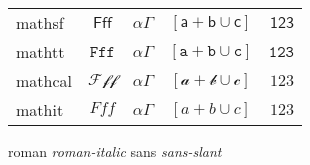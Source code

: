 \documentclass{article}
\def\ltrs{Fff}
\def\grk{\alpha \Gamma}
\def\sym{[a + b \cup c]}
\def\num{123}
\begin{document}
\begin{tabular}{lcccr}
mathsf  & {\boldmath   $\mathsf{\ltrs}$ } & {\boldmath  $\mathsf{\grk}$ } & {\boldmath  $\mathsf{\sym}$ } & {\boldmath  $\mathsf{\num}$ }\\
mathtt  & {\boldmath   $\mathtt{\ltrs}$ } & {\boldmath  $\mathtt{\grk}$ } & {\boldmath  $\mathtt{\sym}$ } & {\boldmath  $\mathtt{\num}$ }\\
mathcal  & {\boldmath   $\mathcal{\ltrs}$ } & {\boldmath  $\mathcal{\grk}$ } & {\boldmath  $\mathcal{\sym}$ } & {\boldmath  $\mathcal{\num}$ }\\
mathit  & {\boldmath   $\mathit{\ltrs}$ } & {\boldmath  $\mathit{\grk}$ } & {\boldmath  $\mathit{\sym}$ } & {\boldmath  $\mathit{\num}$ } \\
\end{tabular}

{\rm roman {\it roman-italic}}  {\sffamily sans {\slshape sans-slant}}
\end{document}
